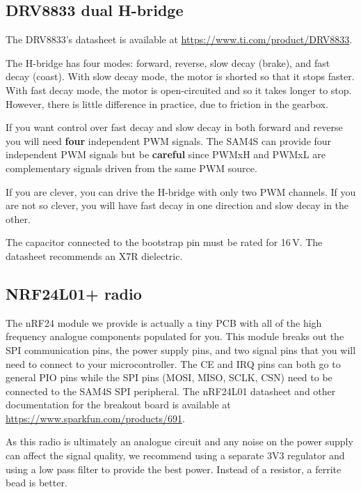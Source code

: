 \subsection{DRV8833 dual H-bridge}\label{drv8833-dual-h-bridge}

The DRV8833's datasheet is available at
\url{https://www.ti.com/product/DRV8833}.

The H-bridge has four modes: forward, reverse, slow decay (brake), and
fast decay (coast).  With slow decay mode, the motor is shorted so
that it stops faster.  With fast decay mode, the motor is
open-circuited and so it takes longer to stop.  However, there is
little difference in practice, due to friction in the gearbox.

If you want control over fast decay and slow decay in both forward and
reverse you will need \textbf{four} independent PWM signals. The SAM4S
can provide four independent PWM signals but be \textbf{careful} since
PWMxH and PWMxL are complementary signals driven from the same PWM
source.

If you are clever, you can drive the H-bridge with only two PWM
channels.  If you are not so clever, you will have fast decay in one
direction and slow decay in the other.

The capacitor connected to the bootstrap pin must be rated for
16\,V. The datasheet recommends an X7R dielectric.

\subsection{NRF24L01+ radio}\label{nrf24l01-radio}

The nRF24 module we provide is actually a tiny PCB with all of the high
frequency analogue components populated for you. This module breaks out
the SPI communication pins, the power supply pins, and two signal pins
that you will need to connect to your microcontroller. The CE and IRQ
pins can both go to general PIO pins while the SPI pins (MOSI, MISO,
SCLK, CSN) need to be connected to the SAM4S SPI peripheral. The
nRF24L01 datasheet and other documentation for the breakout board is
available at \url{https://www.sparkfun.com/products/691}.

As this radio is ultimately an analogue circuit and any noise on the
power supply can affect the signal quality, we recommend using a
separate 3V3 regulator and using a low pass filter to provide the best
power.  Instead of a resistor, a ferrite bead is better.

